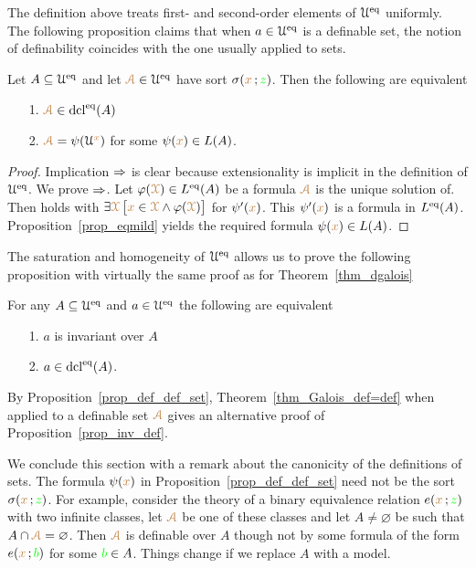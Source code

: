 The definition above treats first- and second-order elements of $\EuScript U^{{\rm eq}}$ uniformly.
The following proposition claims that when $a\in\EuScript U^{{\rm eq}}$ is a definable set, the notion of definability coincides with the one usually applied to sets.

\begin{proposition}\label{prop_def_def_set}
Let $A\subseteq\EuScript U^{{\rm eq}}$ and let ${\color{brown}\EuScript A}\in\EuScript U^{{\rm eq}}$ have sort $\sigma({\color{brown} x}\,;{\color{green} z})$.
Then the following are equivalent
\begin{itemize}
\item[1.] ${\color{brown}\EuScript A}\in{\rm dcl}^{{\rm eq}}(A)$
\item[2.] ${\color{brown}\EuScript A}=\psi(\EuScript U^{\color{brown} x})$ for some $\psi({\color{brown} x})\in L(A)$.
\end{itemize}
\end{proposition}

\begin{proof}
Implication $\Rightarrow$ is clear because extensionality is implicit in the definition of $\EuScript U^{{\rm eq}}$.
We prove $\Rightarrow$.
Let $\varphi({\color{brown}\EuScript X})\in L^{{\rm eq}}(A)$ be a formula ${\color{brown}\EuScript A}$ is the unique solution of.
Then  holds with $\exists {\color{brown}\EuScript X}\,\big[{\color{brown} x}\in {\color{brown}\EuScript X}\wedge\varphi({\color{brown}\EuScript X})\big]$ for $\psi'({\color{brown} x})$. This $\psi'({\color{brown} x})$ is a formula in $L^{{\rm eq}}(A)$. Proposition~\ref{prop_eqmild} yields the required formula $\psi({\color{brown} x})\in L(A)$.
\end{proof}

The saturation and homogeneity of $\EuScript U^{{\rm eq}}$ allows us to prove the following proposition with virtually the same proof as for Theorem~\ref{thm_dgalois}

\begin{theorem}\label{thm_Galois_def=def}
For any $A\subseteq\EuScript U^{{\rm eq}}$ and $a\in\EuScript U^{{\rm eq}}$ the following are equivalent
\begin{itemize}
\item[1.] $a$ is invariant over $A$
\item[2.] $a\in{\rm dcl}^{{\rm eq}}(A)$.
\end{itemize}
\end{theorem}

By Proposition~\ref{prop_def_def_set}, Theorem~\ref{thm_Galois_def=def} when applied to a definable set ${\color{brown}\EuScript A}$ gives an alternative proof of Proposition~\ref{prop_inv_def}.

We conclude this section with a remark about the canonicity of the definitions of sets.
The formula $\psi({\color{brown} x})$ in Proposition~\ref{prop_def_def_set} need not be the sort $\sigma({\color{brown} x}\,;{\color{green} z})$.
For example, consider the theory of a binary equivalence relation $e({\color{brown} x}\,;{\color{green} z})$ with two infinite classes, let ${\color{brown}\EuScript A}$ be one of these classes and let $A\neq\varnothing$ be such that $A\cap {\color{brown}\EuScript A}=\varnothing$.
Then ${\color{brown}\EuScript A}$ is definable over $A$ though not by some formula of the form $e({\color{brown} x}\,;{\color{green} b})$ for some ${\color{green} b}\in A$.
Things change if we replace $A$ with a model.

